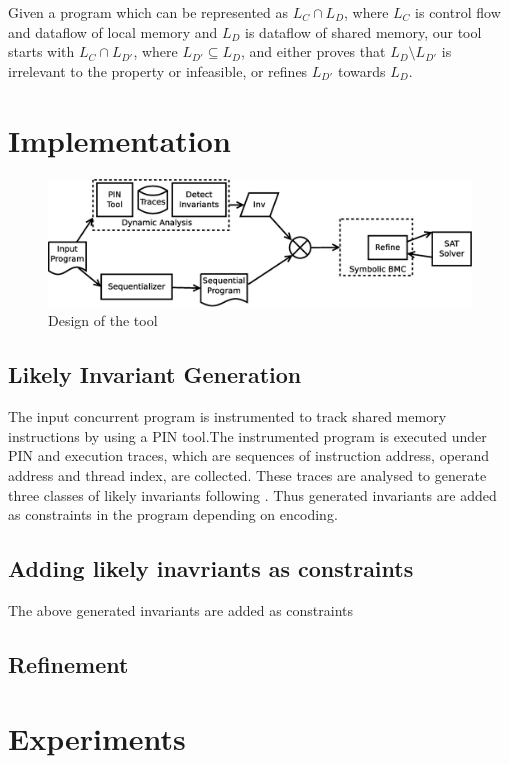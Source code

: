 \documentclass{llncs}
\begin{document}
Given a program which can be represented as $L_C \cap L_D$, where $L_C$ is control flow and dataflow of local memory and $L_D$ is dataflow of shared memory, our tool starts with $L_C \cap L_{D'}$, where $L_{D'} \subseteq L_D$, and either proves that $L_D \setminus L_{D'}$ is irrelevant to the property or infeasible, or refines $L_{D'}$ towards $L_D$. 

\section {Implementation} 
\label{sect:implementation}

\begin{figure}
\includegraphics[scale=0.35]{design.eps}
\centering
\caption{Design of the tool}
\label{fig:design}
\end{figure}

\subsection {Likely Invariant Generation}
\label{sect:inv_gen}
The input concurrent program is instrumented to track shared memory instructions by using a PIN\cite{pin} tool.The instrumented program is executed under PIN and execution traces, which are sequences of instruction address, operand address and thread index, are collected. These traces are analysed to generate three classes of likely invariants following \cite{defuse}. Thus generated invariants are added as constraints in the program depending on encoding. 

\subsection {Adding likely inavriants as constraints}
\label{sect:inv_const}
The above generated invariants are added as constraints 
\subsection {Refinement}
\label{sect:refinement}

\section {Experiments}
\label{sect:experiments}
\end{document}
